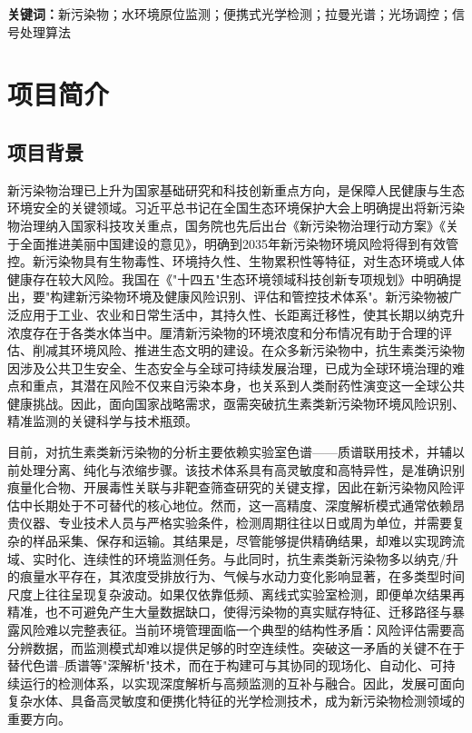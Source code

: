 \documentclass[12pt,a4paper]{article}
\begin{document}
\noindent\textbf{关键词：}新污染物；水环境原位监测；便携式光学检测；拉曼光谱；光场调控；信号处理算法

\newpage
\tableofcontents
\newpage

\section{项目简介}

\subsection{项目背景}

新污染物治理已上升为国家基础研究和科技创新重点方向，是保障人民健康与生态环境安全的关键领域。习近平总书记在全国生态环境保护大会上明确提出将新污染物治理纳入国家科技攻关重点，国务院也先后出台《新污染物治理行动方案》\cite{ref1}《关于全面推进美丽中国建设的意见》\cite{ref2}，明确到2035年新污染物环境风险将得到有效管控。新污染物具有生物毒性、环境持久性、生物累积性等特征，对生态环境或人体健康存在较大风险。我国在《"十四五"生态环境领域科技创新专项规划》\cite{ref3}中明确提出，要"构建新污染物环境及健康风险识别、评估和管控技术体系"。新污染物被广泛应用于工业、农业和日常生活中，其持久性、长距离迁移性，使其长期以纳克升浓度存在于各类水体当中。厘清新污染物的环境浓度和分布情况有助于合理的评估、削减其环境风险、推进生态文明的建设。在众多新污染物中，抗生素类污染物因涉及公共卫生安全、生态安全与全球可持续发展治理，已成为全球环境治理的难点和重点\cite{ref4,ref7,ref9,ref12}，其潜在风险不仅来自污染本身，也关系到人类耐药性演变这一全球公共健康挑战。因此，面向国家战略需求，亟需突破抗生素类新污染物环境风险识别、精准监测的关键科学与技术瓶颈。

目前，对抗生素类新污染物的分析主要依赖实验室色谱——质谱联用技术，并辅以前处理分离、纯化与浓缩步骤。该技术体系具有高灵敏度和高特异性，是准确识别痕量化合物、开展毒性关联与非靶查筛查研究的关键支撑，因此在新污染物风险评估中长期处于不可替代的核心地位\cite{ref5,ref6,ref8,ref13}。然而，这一高精度、深度解析模式通常依赖昂贵仪器、专业技术人员与严格实验条件，检测周期往往以日或周为单位，并需要复杂的样品采集、保存和运输。其结果是，尽管能够提供精确结果，却难以实现跨流域、实时化、连续性的环境监测任务。与此同时，抗生素类新污染物多以纳克/升的痕量水平存在，其浓度受排放行为、气候与水动力变化影响显著，在多类型时间尺度上往往呈现复杂波动。如果仅依靠低频、离线式实验室检测，即便单次结果再精准，也不可避免产生大量数据缺口，使得污染物的真实赋存特征、迁移路径与暴露风险难以完整表征\cite{ref17}。当前环境管理面临一个典型的结构性矛盾：风险评估需要高分辨数据，而监测模式却难以提供足够的时空连续性。突破这一矛盾的关键不在于替代色谱--质谱等"深解析"技术，而在于构建可与其协同的现场化、自动化、可持续运行的检测体系，以实现深度解析与高频监测的互补与融合。因此，发展可面向复杂水体、具备高灵敏度和便携化特征的光学检测技术，成为新污染物检测领域的重要方向。
\end{document}
